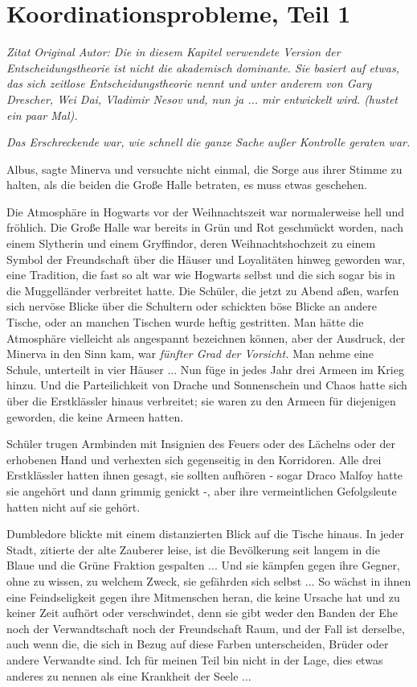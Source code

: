 \chapter{Koordinationsprobleme, Teil 1}

\emph{Zitat Original Autor: Die in diesem Kapitel verwendete Version der
Entscheidungstheorie ist nicht die akademisch dominante. Sie basiert auf etwas,
das sich \glqq{}zeitlose Entscheidungstheorie\grqq{} nennt und unter anderem von
Gary Drescher, Wei Dai, Vladimir Nesov und, nun ja ... mir entwickelt wird.
(hustet ein paar Mal).}

\emph{Das Erschreckende war, wie schnell die ganze Sache außer Kontrolle
geraten war.}

\glqq{}Albus\grqq{}, sagte Minerva und versuchte nicht einmal, die Sorge aus
ihrer Stimme zu halten, als die beiden die Große Halle betraten, \glqq{}es muss
etwas geschehen.\grqq{}

Die Atmosphäre in Hogwarts vor der Weihnachtszeit war normalerweise hell und
fröhlich. Die Große Halle war bereits in Grün und Rot geschmückt worden, nach
einem Slytherin und einem Gryffindor, deren Weihnachtshochzeit zu einem Symbol
der Freundschaft über die Häuser und Loyalitäten hinweg geworden war, eine
Tradition, die fast so alt war wie Hogwarts selbst und die sich sogar bis in die
Muggelländer verbreitet hatte. Die Schüler, die jetzt zu Abend aßen, warfen sich
nervöse Blicke über die Schultern oder schickten böse Blicke an andere Tische,
oder an manchen Tischen wurde heftig gestritten. Man hätte die Atmosphäre
vielleicht als angespannt bezeichnen können, aber der Ausdruck, der Minerva in
den Sinn kam, war \emph{fünfter Grad der Vorsicht.} Man nehme eine Schule,
unterteilt in vier Häuser ... Nun füge in jedes Jahr drei Armeen im Krieg hinzu.
Und die Parteilichkeit von Drache und Sonnenschein und Chaos hatte sich über die
Erstklässler hinaus verbreitet; sie waren zu den Armeen für diejenigen geworden,
die keine Armeen hatten.

Schüler trugen Armbinden mit Insignien des Feuers oder des Lächelns oder der
erhobenen Hand und verhexten sich gegenseitig in den Korridoren. Alle drei
Erstklässler hatten ihnen gesagt, sie sollten aufhören - sogar Draco Malfoy
hatte sie angehört und dann grimmig genickt -, aber ihre vermeintlichen
Gefolgsleute hatten nicht auf sie gehört.

Dumbledore blickte mit einem distanzierten Blick auf die Tische hinaus. \glqq{}In
jeder Stadt\grqq{}, zitierte der alte Zauberer leise, \glqq{}ist die Bevölkerung
seit langem in die Blaue und die Grüne Fraktion gespalten ... Und sie kämpfen
gegen ihre Gegner, ohne zu wissen, zu welchem Zweck, sie gefährden sich selbst
... So wächst in ihnen eine Feindseligkeit gegen ihre Mitmenschen heran, die
keine Ursache hat und zu keiner Zeit aufhört oder verschwindet, denn sie gibt
weder den Banden der Ehe noch der Verwandtschaft noch der Freundschaft Raum, und
der Fall ist derselbe, auch wenn die, die sich in Bezug auf diese Farben
unterscheiden, Brüder oder andere Verwandte sind. Ich für meinen Teil bin nicht
in der Lage, dies etwas anderes zu nennen als eine Krankheit der Seele ...\grqq{}

